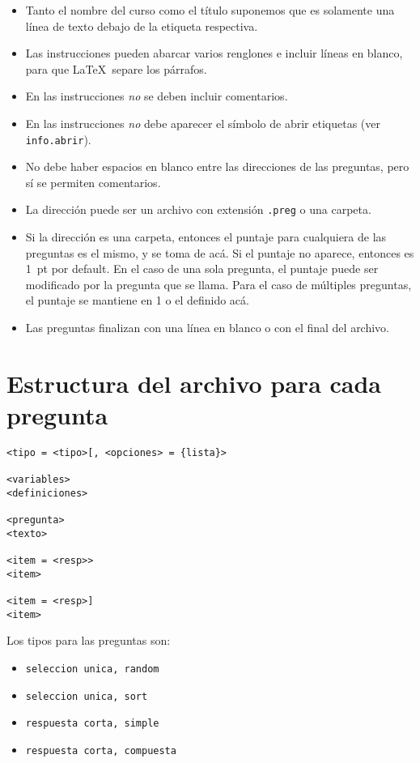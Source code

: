 \documentclass[12pt]{article}
\theoremstyle{definition}
\begin{document}
\begin{itemize}
  \item Tanto el nombre del curso como el título suponemos que es solamente una línea de texto debajo de la etiqueta respectiva.
  \item Las instrucciones pueden abarcar varios renglones e incluir líneas en blanco, para que \LaTeX\ separe los párrafos. 
  \item En las instrucciones \emph{no} se deben incluir comentarios.
  \item En las instrucciones \emph{no} debe aparecer el símbolo de abrir etiquetas (ver \verb|info.abrir|).
  \item No debe haber espacios en blanco entre las direcciones de las preguntas, pero sí se permiten comentarios.
  \item La dirección puede ser un archivo con extensión \verb|.preg| o una carpeta.
  \item Si la dirección es una carpeta, entonces el puntaje para cualquiera de las preguntas es el mismo, y se toma de acá. Si el puntaje no aparece, entonces es 1~pt por default. En el caso de una sola pregunta, el puntaje puede ser modificado por la pregunta que se llama. Para el caso de múltiples preguntas, el puntaje se mantiene en 1 o el definido acá.
  \item Las preguntas finalizan con una línea en blanco o con el final del archivo.
\end{itemize}

\section{Estructura del archivo para cada pregunta}

\begin{verbatim}
<tipo = <tipo>[, <opciones> = {lista}>

<variables>
<definiciones>

<pregunta>
<texto>

<item = <resp>>
<item>

<item = <resp>] 
<item>

\end{verbatim}

Los tipos para las preguntas son:
\begin{itemize}
  \item \verb|seleccion unica, random|
  \item \verb|seleccion unica, sort|
  \item \verb|respuesta corta, simple|
  \item \verb|respuesta corta, compuesta|
\end{itemize}
\end{document}
